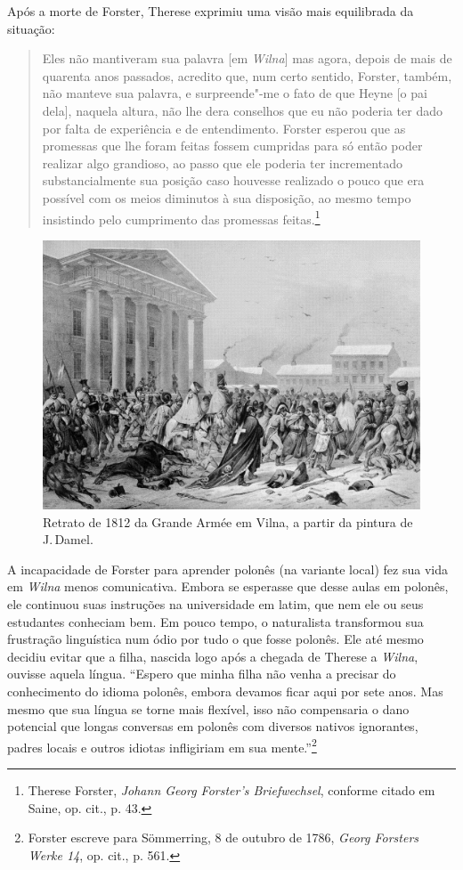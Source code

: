 Após a morte de Forster, Therese exprimiu uma visão mais equilibrada da
situação:

\begin{quote}
Eles não mantiveram sua palavra {[}em \textit{Wilna}{]} mas agora, depois de mais
de quarenta anos passados, acredito que, num certo sentido, Forster,
também, não manteve sua palavra, e surpreende"-me o fato de que Heyne
{[}o pai dela{]}, naquela altura, não lhe dera conselhos que eu não
poderia ter dado por falta de experiência e de entendimento. Forster
esperou que as promessas que lhe foram feitas fossem cumpridas para só
então poder realizar algo grandioso, ao passo que ele poderia ter
incrementado substancialmente sua posição caso houvesse realizado o
pouco que era possível com os meios diminutos à sua disposição, ao mesmo
tempo insistindo pelo cumprimento das promessas feitas.\footnote{Therese Forster, \textit{Johann Georg Forster's Briefwechsel}, conforme citado em Saine, op. cit., p. 43.} 
\end{quote}

\begin{figure}[!h]
    \centering
    \includegraphics[width=\textwidth]{ilustra-06.png}
    \caption{Retrato de 1812 da Grande Armée em Vilna, a partir da pintura de J.\,Damel.}
\end{figure}

A incapacidade de Forster para aprender polonês (na variante local) fez
sua vida em \textit{Wilna} menos comunicativa. Embora se esperasse que desse
aulas em polonês, ele continuou suas instruções na universidade em
latim, que nem ele ou seus estudantes conheciam bem. Em pouco tempo, o
naturalista transformou sua frustração linguística num ódio por tudo o
que fosse polonês. Ele até mesmo decidiu evitar que a filha, nascida
logo após a chegada de Therese a \textit{Wilna}, ouvisse aquela língua. ``Espero
que minha filha não venha a precisar do conhecimento do idioma polonês,
embora devamos ficar aqui por sete anos. Mas mesmo que sua língua se
torne mais flexível, isso não compensaria o dano potencial que longas
conversas em polonês com diversos nativos ignorantes, padres locais e
outros idiotas infligiriam em sua mente.''\footnote{Forster escreve para Sömmerring, 8 de outubro de 1786, \textit{Georg Forsters Werke 14}, op. cit., p. 561.}

